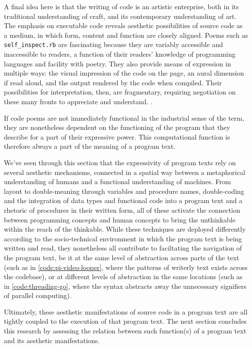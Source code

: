 A final idea here is that the writing of code is an artistic enterprise, both in its traditional understanding of craft, and its contemporary understanding of art. The emphasis on executable code reveals aesthetic possibilities of source code as a medium, in which form, content and function are closely aligned. Poems such as \lstinline{self_inspect.rb} are fascinating because they are variably accessible and inaccessible to readers, a function of their readers' knowledge of programming languages and facility with poetry. They also provide means of expression in multiple ways: the visual impression of the code on the page, an aural dimension if read aloud, and the output rendered by the code when compiled. Their possibilities for interpretation, then, are fragmentary, requiring negotiation on these many fronts to appreciate and understand. \citep{risam_poetry_2015}.

If code poems are not immediately functional in the industrial sense of the term, they are nonetheless dependent on the functioning of the program that they describe for a part of their expressive power. This computational function is therefore always a part of the meaning of a program text.

\spacersmall

We've seen through this section that the expressivity of program texts rely on several aesthetic mechanisms, connected in a spatial way between a metaphorical understanding of humans and a functional understanding of machines. From layout to double-meaning through variables and procedure names, double-coding and the integration of data types and functional code into a program text and a rhetoric of procedures in their written form, all of these activate the connection between programming concepts and human concepts to bring the unthinkable within the reach of the thinkable. While these techniques are deployed differently according to the socio-technical environment in which the program text is being written and read, they nonetheless all contribute to faciltating the navigation of the program text, be it at the same level of abstraction across parts of the text (such as in \ref{code:pi-video-looper}, where the patterns of writerly text exists across the codebase), or at different levels of abstraction in the same locations (such as in \ref{code:threading-go}, where the syntax abstracts away the unnecessary signifiers of parallel computing).

Ultimately, these aesthetic manifestations of source code in a program text are all tightly coupled to the execution of that program text. The next section concludes this research by assessing the relation between such function(s) of a program text and its aesthetic manifestations.

